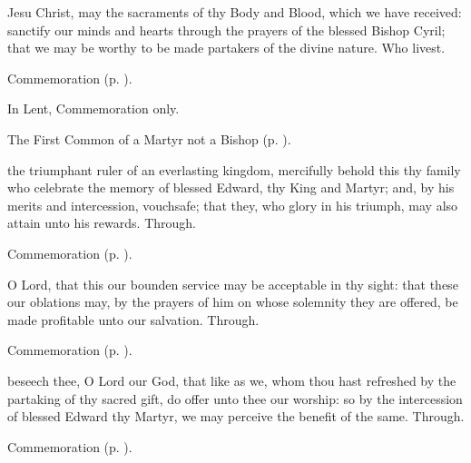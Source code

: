 \postcommunion\label{CyrilPostcommunion}
 Jesu Christ, may the sacraments of thy Body and Blood, which we have received: sanctify our minds and hearts through the prayers of the blessed Bishop Cyril; that we may be worthy to be made partakers of the divine nature. Who livest.

\begin{rubric}
	Commemoration  (p. \pageref{EdwardPostcommunion}).
\end{rubric}


\clearpage
{}

\begin{rubric}
	In Lent, Commemoration only.
\end{rubric}

\begin{rubric}
	The First Common of a Martyr not a Bishop (p. \pageref{CommonMartyrNotBishopI}).
\end{rubric}

\collect\label{EdwardCollect}
 the triumphant ruler of an everlasting kingdom, mercifully behold this thy family who celebrate the memory of blessed Edward, thy King and Martyr; and, by his merits and intercession, vouchsafe; that they, who glory in his triumph, may also attain unto his rewards. Through.

\begin{rubric}
	Commemoration  (p. \pageref{CyrilCollect}).
\end{rubric}

\secret\label{EdwardSecret}
 O Lord, that this our bounden service may be acceptable in thy sight: that these our oblations may, by the prayers of him on whose solemnity they are offered, be made profitable unto our salvation. Through.
\begin{rubric}
	Commemoration  (p. \pageref{CyrilSecret}).
\end{rubric}

\postcommunion\label{EdwardPostcommunion}
 beseech thee, O Lord our God, that like as we, whom thou hast refreshed by the partaking of thy sacred gift, do offer unto thee our worship: so by the intercession of blessed Edward thy Martyr, we may perceive the benefit of the same. Through.

\begin{rubric}
	Commemoration  (p. \pageref{CyrilPostcommunion}).
\end{rubric}


